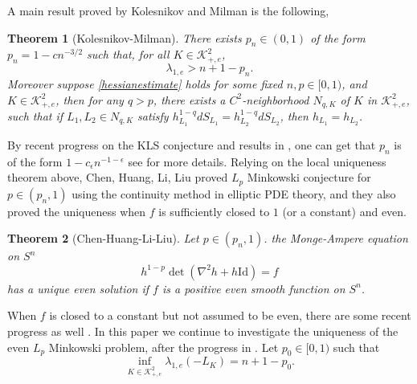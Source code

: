\documentclass[reqno]{amsart}
\theoremstyle{remark}
\def\cK{{\mathcal K}}
\theoremstyle{plain}
\newtheorem{thm}{Theorem}
\begin{document}
A main result proved by Kolesnikov and Milman \cite{KM01} is the following, 
\begin{thm}[Kolesnikov-Milman]
There exists $p_n\in (0, 1)$ of the form $p_n=1-cn^{-3/2}$ such that, for all $K\in \cK_{+, e}^2$, 
\[
\lambda_{1, e}>n+1-p_n.
\]
Moreover suppose \eqref{hessianestimate} holds for some fixed $n, p\in[0,1)$, and $K\in \cK_{+,e}^2$, then for any $q>p$, there exists a $C^2$-neighborhood $N_{q,K}$ of $K$ in $\cK_{+,e}^2$, such that if  $L_1,L_2\in N_{q,K}$ satisfy $h_{L_1}^{1-q}dS_{L_1}=h_{L_2}^{1-q}dS_{L_2}$, then $h_{L_1}=h_{L_2}$.
\end{thm} 
By recent progress on the KLS conjecture  \cite{ChenY} and results in \cite{KM01}, one can get that $p_n$ is of the form $1-c_\epsilon n^{-1-\epsilon}$ see \cite{Milman23, B24} for more details. 
Relying on the local uniqueness theorem above,  Chen, Huang, Li, Liu \cite{CHLL} proved $L_p$ Minkowski conjecture for $p\in (p_n, 1)$ using the continuity method in elliptic PDE theory, and they also proved the uniqueness when $f$ is sufficiently closed to $1$ (or a constant) and even. 
\begin{thm}[Chen-Huang-Li-Liu]
    Let $p\in (p_n, 1)$. the Monge-Ampere equation on $S^n$
    \[
    h^{1-p}\det(\nabla^2 h+h\text{Id})=f
    \]
    has a unique even solution if $f$ is a positive even smooth function on $S^n$. 
\end{thm}
 When $f$ is closed to a constant but not assumed to be even, there are some recent progress as well \cite{CFL, BS}.
In this paper we continue to investigate the uniqueness of the even $L_p$ Minkowski problem, after the progress in \cite{KM01, CHLL, Put}. Let $p_0\in [0, 1)$ such that
\begin{equation}
    \inf_{K\in \cK^2_{+, e}} \lambda_{1, e}(-L_K)=n+1-p_0.
\end{equation}
\end{document}

